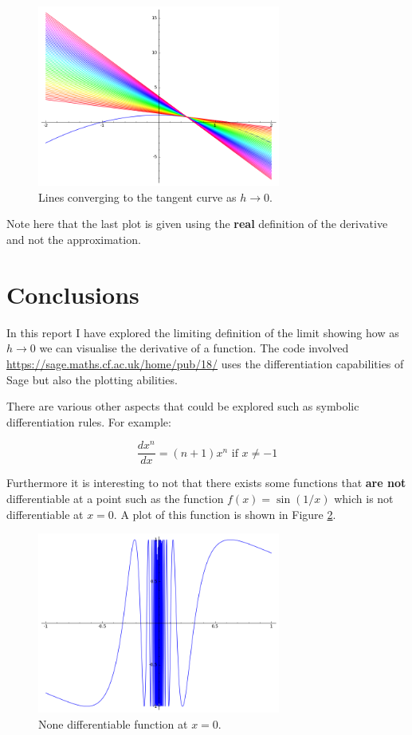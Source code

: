 \documentclass[a4paper]{article}
\theoremstyle{break}
\begin{document}
\begin{figure}[!htbp]
\begin{center}
\includegraphics[width=8cm]{sage0.png}
\end{center}
\caption{Lines converging to the tangent curve as $h\to0$.}\label{lines}
\end{figure}

Note here that the last plot is given using the \textbf{real} definition of the derivative and not the approximation.

\section{Conclusions}

In this report I have explored the limiting definition of the limit showing how as $h\to 0$ we can visualise the derivative of a function. The code involved \url{https://sage.maths.cf.ac.uk/home/pub/18/} uses the differentiation capabilities of Sage but also the plotting abilities.

There are various other aspects that could be explored such as symbolic differentiation rules. For example:

$$\frac{dx^n}{dx}=(n+1)x^{n}\text{ if }x\ne-1$$

Furthermore it is interesting to not that there exists some functions that \textbf{are not} differentiable at a point such as the function $f(x)=\sin(1/x)$ which is not differentiable at $x=0$. A plot of this function is shown in Figure \ref{notdiff}.

\begin{figure}[!htbp]
\begin{center}
\includegraphics[width=8cm]{sage2.png}
\end{center}
\caption{None differentiable function at $x=0$.}\label{notdiff}
\end{figure}




\end{document}
